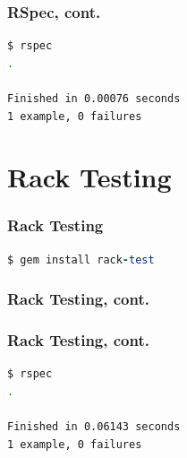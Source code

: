 \documentclass{beamer}
\begin{document}
\begin{frame}[fragile]\frametitle{RSpec, cont.} 

  
  \pause

  
  \pause

  \begin{lstlisting}[language=bash, escapechar={^}]
$ rspec
.

Finished in 0.00076 seconds
1 example, 0 failures
  \end{lstlisting}

\end{frame}


\section{Rack Testing}
\begin{frame}[fragile]\frametitle{Rack Testing} 
  \begin{lstlisting}[language=ruby, escapechar={^}]
$ gem install rack-test
  \end{lstlisting}
  \pause

  
  \pause

  
  
\end{frame}


\begin{frame}[fragile]\frametitle{Rack Testing, cont.} 

  
  
\end{frame}



\begin{frame}[fragile]\frametitle{Rack Testing, cont.} 

  \begin{lstlisting}[language=bash, escapechar={^}]
$ rspec 
.

Finished in 0.06143 seconds
1 example, 0 failures
  \end{lstlisting}
  
\end{frame}
\end{document}
